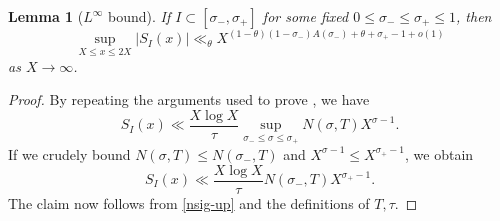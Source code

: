 \documentclass[10pt,a4paper]{amsart}
\newtheorem{lemma}{Lemma}
\begin{document}
\begin{lemma}[$L^\infty$ bound]\label{linfty-bound}  If $I \subset [\sigma_-, \sigma_+]$ for some fixed $0 \leq \sigma_- \leq \sigma_+ \leq 1$, then
$$ \sup_{X \leq x \leq 2X} |S_I(x)| \ll_\theta X^{(1-\theta)(1-\sigma_-) A(\sigma_-) + \theta + \sigma_+ - 1 + o(1)}$$
as $X \to \infty$.
\end{lemma}

\begin{proof}
By repeating the arguments used to prove , we have
$$ S_I(x) \ll \frac{X \log X}{\tau} \sup_{\sigma_- \leq \sigma \leq \sigma_+} N(\sigma,T) X^{\sigma-1}.$$
If we crudely bound $N(\sigma,T) \leq N(\sigma_-,T)$ and $X^{\sigma-1} \leq X^{\sigma_+ - 1}$, we obtain
$$ S_I(x) \ll \frac{X \log X}{\tau} N(\sigma_-,T) X^{\sigma_+ - 1}.$$
The claim now follows from \eqref{nsig-up} and the definitions of $T,\tau$.
\end{proof}
\end{document}

